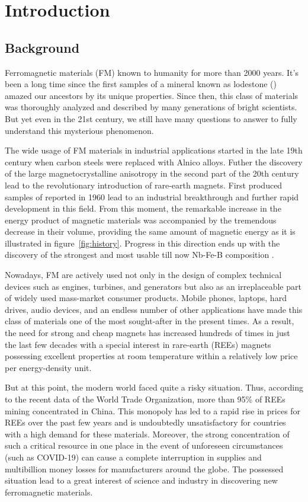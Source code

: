 \chapter{Introduction}

\section{Background}
Ferromagnetic materials (FM) known to humanity for more than 2000 years. It's been a long time since the first samples of a mineral known as lodestone () amazed our ancestors by its unique properties. Since then, this class of materials was thoroughly analyzed and described by many generations of bright scientists. But yet even in the 21st century, we still have many questions to answer to fully understand this mysterious phenomenon. 

The wide usage of FM materials in industrial applications started in the late 19th century when carbon steels were replaced with Alnico alloys.  Futher the discovery of the large magnetocrystalline anisotropy in the second part of the 20th century lead to the revolutionary introduction of rare-earth magnets. First produced samples of  reported in 1960 lead to an industrial breakthrough and further rapid development in this field.  From this moment, the remarkable increase in the energy product of magnetic materials was accompanied by the tremendous decrease in their volume, providing the same amount of magnetic energy as it is illustrated in figure~\ref{fig:history}.  Progress in this direction ends up with the discovery of the strongest and most usable till now Nb-Fe-B composition \cite{Gutfleisch2010}. 

Nowadays, FM are actively used not only in the design of complex technical devices such as engines, turbines, and generators but also as an irreplaceable part of widely used mass-market consumer products. Mobile phones, laptops, hard drives, audio devices, and an endless number of other applications have made this class of materials one of the most sought-after in the present times. As a result, the need for strong and cheap magnets has increased hundreds of times in just the last few decades with a special interest in rare-earth (REEs) magnets possessing excellent properties at room temperature within a relatively low price per energy-density unit.

But at this point, the modern world faced quite a risky situation. Thus, according to the recent data of the World Trade Organization, more than 95\% of REEs mining concentrated in China. This monopoly has led to a rapid rise in prices for REEs over the past few years and is undoubtedly unsatisfactory for countries with a high demand for these materials. Moreover, the strong concentration of such a critical resource in one place in the event of unforeseen circumstances (such as COVID-19) can cause a complete interruption in supplies and multibillion money losses for manufacturers around the globe. The possessed situation lead to a great interest of science and industry in discovering new ferromagnetic materials. 

